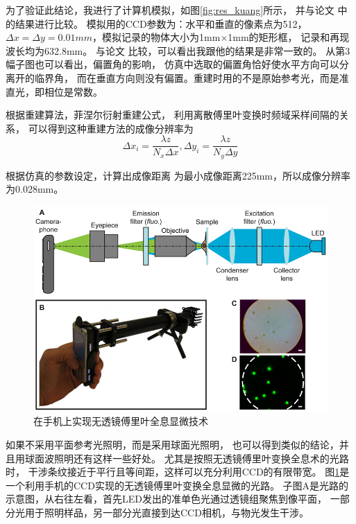 \documentclass[11pt,a4paper]{article}
\begin{document}
为了验证此结论，我进行了计算机模拟，如图\ref{fig:res_kuang}所示，
并与论文\cite{王华英2008数字全息显微成像的理论和实验研究}
中的结果进行比较。
模拟用的CCD参数为：水平和垂直的像素点为512，
$\Delta x=\Delta y = 0.01mm$，模拟记录的物体大小为1mm$\times$1mm的矩形框，
记录和再现波长均为632.8mm。
与论文\cite{王华英2008数字全息显微成像的理论和实验研究}
比较，可以看出我跟他的结果是非常一致的。
从第3幅子图也可以看出，偏置角的影响，
仿真中选取的偏置角恰好使水平方向可以分离开的临界角，
而在垂直方向则没有偏置。重建时用的不是原始参考光，而是准直光，即相位是常数。



根据重建算法，菲涅尔衍射重建公式，
利用离散傅里叶变换时频域采样间隔的关系，
可以得到这种重建方法的成像分辨率为
\begin{equation}
\Delta x_i = \frac{\lambda z}{N_x \Delta x},
\Delta y_i = \frac{\lambda z}{N_y \Delta y}
\end{equation}

根据仿真的参数设定，计算出成像距离
为最小成像距离225mm，所以成像分辨率为0.028mm。

\begin{figure}[htb]
  \centering
  \includegraphics[width=\textwidth]{DHmobile1.png}
  \caption{在手机上实现无透镜傅里叶全息显微技术\cite{tseng2010lensfree}}
  \label{fig:DHcellphone1}
\end{figure}

如果不采用平面参考光照明，而是采用球面光照明，
也可以得到类似的结论，并且用球面波照明还有这样一些好处。
尤其是按照无透镜傅里叶变换全息术的光路时，
干涉条纹接近于平行且等间距，这样可以充分利用CCD的有限带宽。
图\ref{fig:DHcellphone1}是一个利用手机的CCD实现的无透镜傅里叶变换全息显微的光路。
子图A是光路的示意图，从右往左看，首先LED发出的准单色光通过透镜组聚焦到像平面，
一部分光用于照明样品，另一部分光直接到达CCD相机，与物光发生干涉。
\end{document}
